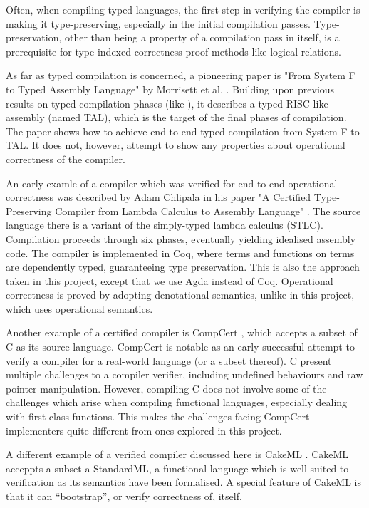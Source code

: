 \documentclass[bsc,frontabs,oneside,singlespacing,parskip,deptreport]{infthesis}
\theoremstyle{definition}
\theoremstyle{lemma}
\begin{document}
Often, when compiling typed languages, the first step in verifying the
compiler is making it type-preserving, especially in the initial
compilation passes. Type-preservation, other than being a property of
a compilation pass in itself, is a prerequisite for type-indexed
correctness proof methods like logical relations.

As far as typed compilation is concerned, a pioneering paper is "From
System F to Typed Assembly Language" by Morrisett et
al. \cite{DBLP:conf/popl/MorrisettWCG98}. Building upon previous
results on typed compilation phases (like
\cite{DBLP:conf/popl/MinamideMH96}), it describes a typed RISC-like
assembly (named TAL), which is the target of the final phases of
compilation. The paper shows how to achieve end-to-end typed
compilation from System F to TAL. It does not, however, attempt to
show any properties about operational correctness of the compiler.

An early examle of a compiler which was verified for end-to-end
operational correctness was described by Adam Chlipala in his paper "A
Certified Type-Preserving Compiler from Lambda Calculus to Assembly
Language" \cite{DBLP:conf/pldi/Chlipala07}. The source language there
is a variant of the simply-typed lambda calculus (STLC). Compilation
proceeds through six phases, eventually yielding idealised assembly
code. The compiler is implemented in Coq, where terms and functions on
terms are dependently typed, guaranteeing type preservation. This is
also the approach taken in this project, except that we use Agda
instead of Coq. Operational correctness is proved by adopting
denotational semantics, unlike in this project, which uses operational
semantics.

Another example of a certified compiler is CompCert
\cite{DBLP:conf/popl/Leroy06}, which accepts a subset of C as its
source language. CompCert is notable as an early successful attempt to
verify a compiler for a real-world language (or a subset thereof). C
present multiple challenges to a compiler verifier, including
undefined behaviours and raw pointer manipulation. However, compiling
C does not involve some of the challenges which arise when compiling
functional languages, especially dealing with first-class
functions. This makes the challenges facing CompCert implementers
quite different from ones explored in this project.

A different example of a verified compiler discussed here is CakeML
\cite{POPL14}. CakeML acceppts a subset a StandardML, a functional
language which is well-suited to verification as its semantics have
been formalised. A special feature of CakeML is that it can
``bootstrap'', or verify correctness of, itself.
\end{document}
